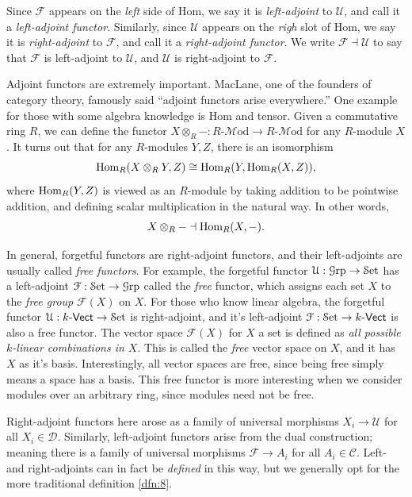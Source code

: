 Since $\mathcal{F} $ appears on the \emph{left} side of Hom, we say it is \emph{left-adjoint} to $\mathcal{U} $, and call it a \emph{left-adjoint functor}. Similarly, since $\mathcal{U} $ appears on the \emph{righ} slot of Hom, we say it is \emph{right-adjoint} to $\mathcal{F} $, and call it a \emph{right-adjoint functor}. We write $\mathcal{F} \dashv \mathcal{U} $ to say that $\mathcal{F} $ is left-adjoint to $\mathcal{U} $, and $\mathcal{U} $ is right-adjoint to $\mathcal{F} $.

Adjoint functors are extremely important. MacLane, one of the founders of category theory, famously said ``adjoint functors arise everywhere.'' One example for those with some algebra knowledge is Hom and tensor. Given a commutative ring $R$, we can define the functor $X\otimes _R-: R\text{-} \mathcal{M} \mathrm{od}  \to R\text{-} \mathcal{M} \mathrm{od} $ for any $R$-module $X$. It turns out that for any $R$-modules $Y,Z$, there is an isomorphism
\[
	\operatorname{Hom}_{R}(X\otimes _RY, Z) \cong \operatorname{Hom}_{R}(Y, \operatorname{Hom}_{R}(X, Z) ) ,
\]
where $\operatorname{Hom}_{R}(Y, Z) $ is viewed as an $R$-module by taking addition to be pointwise addition, and defining scalar multiplication in the natural way. In other words,
\[
	X\otimes_R-\dashv \operatorname{Hom}_{R}(X, -) 
.\]

In general, forgetful functors are right-adjoint functors, and their left-adjoints are usually called \emph{free functors}. For example, the forgetful functor $\mathcal{U} : \mathcal{G}\mathrm{rp}  \to \mathcal{S}\mathrm{et}$ has a left-adjoint $\mathcal{F} : \mathcal{S}\mathrm{et}  \to \mathcal{G}\mathrm{rp} $ called the \emph{free} functor, which assigns each set $X$ to the \emph{free group} $\mathcal{F} (X)$ on $X$. For those who know linear algebra, the forgetful functor $\mathcal{U} : k\text{-}\mathsf{Vect}  \to \mathcal{S}\mathrm{et} $ is right-adjoint, and it's left-adjoint $\mathcal{F} : \mathcal{S}\mathrm{et}  \to k\text{-}\mathsf{Vect}$ is also a free functor. The vector space $\mathcal{F} (X)$ for $X$ a set is defined as \emph{all possible $k$-linear combinations in $X$}. This is called the \emph{free} vector space on $X$, and it has $X$ as it's basis. Interestingly, all vector spaces are free, since being free simply means a space has a basis. This free functor is more interesting when we consider modules over an arbitrary ring, since modules need not be free.

\begin{remark}
	Right-adjoint functors here arose as a family of universal morphisms $X_i\to \mathcal{U} $ for all $X_i\in \mathcal{D} $. Similarly, left-adjoint functors arise from the dual construction; meaning there is a family of universal morphisms $\mathcal{F} \to A_i$ for all $A_i\in \mathcal{C} $. Left- and right-adjoints can in fact be \emph{defined} in this way, but we generally opt for the more traditional definition \ref{dfn:8}.
\end{remark}

